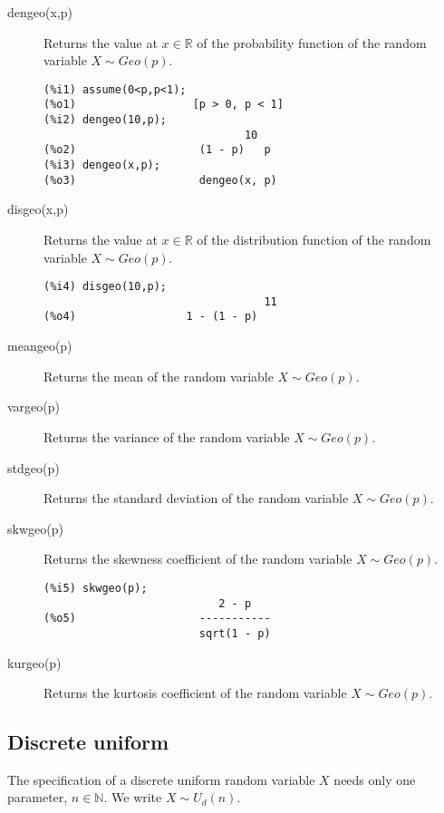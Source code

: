 \documentclass[12pt,a4paper]{article}
\newcommand{\N}{\mathbb{N}}
\newcommand{\R}{\mathbb{R}}
\begin{document}
\begin{description}

\item[dengeo(x,p)] Returns the value at $x \in \R$ of the probability function of the random variable $X \sim Geo(p)$.

\begin{verbatim}
(%i1) assume(0<p,p<1);
(%o1)                  [p > 0, p < 1]
(%i2) dengeo(10,p);
                               10
(%o2)                   (1 - p)   p
(%i3) dengeo(x,p);
(%o3)                   dengeo(x, p)
\end{verbatim}

\item[disgeo(x,p)] Returns the value at $x \in \R$ of the distribution function of the random variable $X \sim Geo(p)$.

\begin{verbatim}
(%i4) disgeo(10,p);
                                  11
(%o4)                 1 - (1 - p)
\end{verbatim}

\item[meangeo(p)] Returns the mean of the random variable  $X \sim Geo(p)$.

\item[vargeo(p)] Returns the variance of the random variable  $X \sim Geo(p)$.

\item[stdgeo(p)] Returns the standard deviation of the random variable  $X \sim Geo(p)$.

\item[skwgeo(p)] Returns the skewness coefficient of the random variable  $X \sim Geo(p)$.

\begin{verbatim}
(%i5) skwgeo(p);
                           2 - p
(%o5)                   -----------
                        sqrt(1 - p)
\end{verbatim}

\item[kurgeo(p)] Returns the kurtosis coefficient of the random variable  $X \sim Geo(p)$.


\end{description}

\subsection{Discrete uniform}

The specification of a discrete uniform random variable $X$ needs only one parameter,  $n \in \N$. We write $X \sim U_d(n)$.
\end{document}
